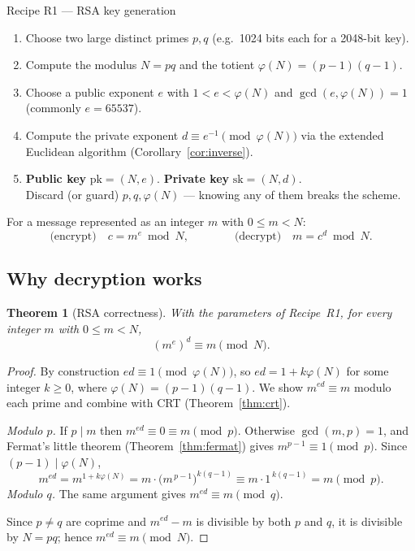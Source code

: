 \documentclass[11pt]{article}
\theoremstyle{plain}
\newtheorem{theorem}{Theorem}[section]
\theoremstyle{definition}
\theoremstyle{remark}
\begin{document}
\begin{recipebox}{Recipe R1 --- RSA key generation}
\begin{enumerate}[leftmargin=2.2em,itemsep=1pt,topsep=3pt]
  \item Choose two large distinct primes $p,q$ (e.g.\ 1024 bits each for a 2048-bit key).
  \item Compute the modulus $N = pq$ and the totient $\varphi(N) = (p-1)(q-1)$.
  \item Choose a public exponent $e$ with $1<e<\varphi(N)$ and $\gcd(e,\varphi(N))=1$
        (commonly $e=65537$).
  \item Compute the private exponent $d \equiv e^{-1} \pmod{\varphi(N)}$ via the
        extended Euclidean algorithm (Corollary~\ref{cor:inverse}).
  \item \textbf{Public key} $\mathrm{pk}=(N,e)$. \quad
        \textbf{Private key} $\mathrm{sk}=(N,d)$. \\
        Discard (or guard) $p,q,\varphi(N)$ --- knowing any of them breaks the scheme.
\end{enumerate}
\end{recipebox}

For a message represented as an integer $m$ with $0\le m<N$:
\[
  \text{(encrypt)}\quad c = m^{e} \bmod N,
  \qquad\qquad
  \text{(decrypt)}\quad m = c^{d} \bmod N.
\]

\subsection{Why decryption works}\label{sec:rsa-correct}

\begin{theorem}[RSA correctness]\label{thm:rsa}
With the parameters of Recipe~R1, for every integer $m$ with $0\le m<N$,
\[
  (m^{e})^{d} \equiv m \pmod N .
\]
\end{theorem}

\begin{proof}
By construction $ed\equiv 1 \pmod{\varphi(N)}$, so $ed = 1 + k\varphi(N)$ for some
integer $k\ge 0$, where $\varphi(N)=(p-1)(q-1)$. We show $m^{ed}\equiv m$ modulo each
prime and combine with CRT (Theorem~\ref{thm:crt}).

\emph{Modulo $p$.} If $p\mid m$ then $m^{ed}\equiv 0\equiv m \pmod p$. Otherwise
$\gcd(m,p)=1$, and Fermat's little theorem (Theorem~\ref{thm:fermat}) gives
$m^{p-1}\equiv 1\pmod p$. Since $(p-1)\mid \varphi(N)$,
\[
  m^{ed}=m^{1+k\varphi(N)}
       = m\cdot\bigl(m^{\,p-1}\bigr)^{k(q-1)}
       \equiv m\cdot 1^{\,k(q-1)} = m \pmod p .
\]
\emph{Modulo $q$.} The same argument gives $m^{ed}\equiv m \pmod q$.

Since $p\neq q$ are coprime and $m^{ed}-m$ is divisible by both $p$ and $q$, it is
divisible by $N=pq$; hence $m^{ed}\equiv m \pmod N$.
\end{proof}
\end{document}
